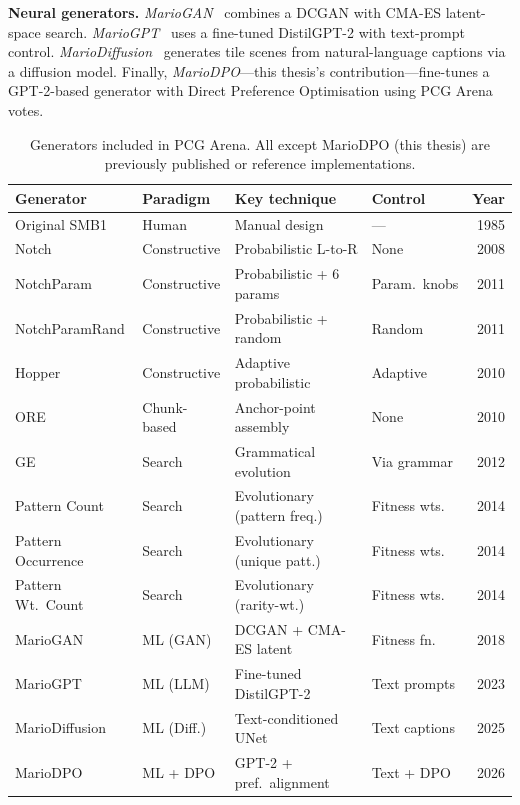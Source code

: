\documentclass[shortabstract, mgr, english]{iithesis}
\begin{document}
\textbf{Neural generators.} \emph{MarioGAN}~\citep{volz2018evolving} combines a
DCGAN with CMA-ES latent-space search.
\emph{MarioGPT}~\citep{sudhakaran2023mariogpt} uses a fine-tuned DistilGPT-2
with text-prompt control.
\emph{MarioDiffusion}~\citep{schrum2025mariodiffusion} generates tile scenes from
natural-language captions via a diffusion model. Finally, \emph{MarioDPO}---this
thesis's contribution---fine-tunes a GPT-2-based generator with Direct Preference
Optimisation using PCG Arena votes.

\begin{table}[H]
\centering
\footnotesize
\begin{tabular}{@{} l l l l r @{}}
\toprule
\textbf{Generator} & \textbf{Paradigm} & \textbf{Key technique} & \textbf{Control} & \textbf{Year} \\
\midrule
Original SMB1      & Human        & Manual design               & ---            & 1985 \\
Notch              & Constructive & Probabilistic L-to-R        & None           & 2008 \\
NotchParam         & Constructive & Probabilistic + 6 params    & Param.\ knobs  & 2011 \\
NotchParamRand     & Constructive & Probabilistic + random      & Random         & 2011 \\
Hopper             & Constructive & Adaptive probabilistic      & Adaptive       & 2010 \\
ORE                & Chunk-based  & Anchor-point assembly       & None           & 2010 \\
GE                 & Search       & Grammatical evolution       & Via grammar    & 2012 \\
Pattern Count      & Search       & Evolutionary (pattern freq.)& Fitness wts.   & 2014 \\
Pattern Occurrence & Search       & Evolutionary (unique patt.) & Fitness wts.   & 2014 \\
Pattern Wt.\ Count & Search       & Evolutionary (rarity-wt.)   & Fitness wts.   & 2014 \\
MarioGAN           & ML (GAN)     & DCGAN + CMA-ES latent       & Fitness fn.    & 2018 \\
MarioGPT           & ML (LLM)     & Fine-tuned DistilGPT-2      & Text prompts   & 2023 \\
MarioDiffusion     & ML (Diff.)   & Text-conditioned UNet       & Text captions  & 2025 \\
MarioDPO           & ML + DPO     & GPT-2 + pref.\ alignment    & Text + DPO     & 2026 \\
\bottomrule
\end{tabular}
\caption{Generators included in PCG Arena. All except MarioDPO (this thesis) are
previously published or reference implementations.}
\label{tab:generators}
\end{table}
\end{document}
